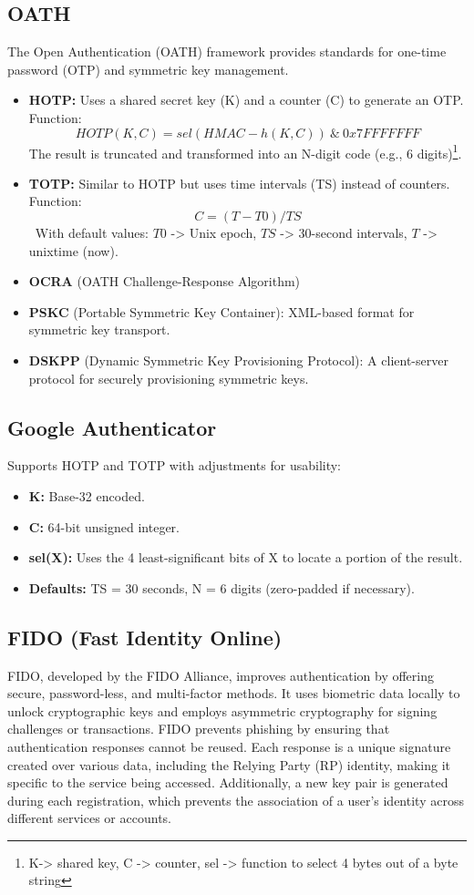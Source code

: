 \subsection{OATH}
The Open Authentication (OATH) framework provides standards for one-time password (OTP) and symmetric key management.
\begin{itemize}
    \item \textbf{HOTP:} Uses a shared secret key (K) and a counter (C) to generate an OTP.
    \\Function:
    \[ HOTP(K, C) = sel(HMAC-h(K, C))\ \&\ 0x7FFFFFFF\] 
    The result is truncated and transformed into an N-digit code (e.g., 6 digits)\footnote{K-> shared key, C -> counter, sel -> function to select 4 bytes out of a byte string}.
    
    \item \textbf{TOTP:} Similar to HOTP but uses time intervals (TS) instead of counters.\\
    Function:
    \[C = (T - T0) / TS\]\
    With default values: \(T0\) -> Unix epoch, \(TS\) -> 30-second intervals, \(T\) -> unixtime (now).
    \item \textbf{OCRA} (OATH Challenge-Response Algorithm)
    \item \textbf{PSKC} (Portable Symmetric Key Container): XML-based format for symmetric key transport.
    \item \textbf{DSKPP} (Dynamic Symmetric Key Provisioning Protocol): A client-server protocol for securely provisioning symmetric keys.
\end{itemize}

\subsection{Google Authenticator}
Supports HOTP and TOTP with adjustments for usability:
\begin{itemize}
    \item \textbf{K:} Base-32 encoded.
    \item \textbf{C:} 64-bit unsigned integer.
    \item \textbf{sel(X):} Uses the 4 least-significant bits of X to locate a portion of the result.
    \item \textbf{Defaults:} TS = 30 seconds, N = 6 digits (zero-padded if necessary).
\end{itemize}

\subsection{FIDO (Fast Identity Online)}
FIDO, developed by the FIDO Alliance, improves authentication by offering secure, password-less, and multi-factor methods. It uses biometric data locally to unlock cryptographic keys and employs asymmetric cryptography for signing challenges or transactions. FIDO prevents phishing by ensuring that authentication responses cannot be reused. Each response is a unique signature created over various data, including the Relying Party (RP) identity, making it specific to the service being accessed. Additionally, a new key pair is generated during each registration, which prevents the association of a user’s identity across different services or accounts.
